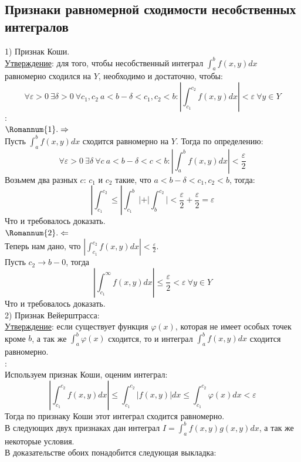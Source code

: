 \documentclass[12pt]{article}
\begin{document}
\subsection{Признаки равномерной сходимости несобственных интегралов}
1) Признак Коши.\\
\uline{Утверждение}: для того, чтобы несобственный интеграл $\int_a^b f(x,y) dx$ равномерно сходился на $Y$, необходимо и достаточно, чтобы:\\
$$\forall \varepsilon > 0 \ \exists \delta > 0 \ \forall c_1, c_2 \ a < b-\delta < c_1,c_2<b : |\int_{c_1}^{c_2} f(x,y) dx | < \varepsilon \ \forall y \in Y$$
:\\
$\Romannum{1}. \Rightarrow$\\
Пусть $\int_a^b f(x,y)dx$ сходится равномерно на $Y$. Тогда по определению:\\
$$\forall \varepsilon > 0 \ \exists \delta \ \forall c \ a < b -\delta < c < b : |\int_a^b f(x,y) dx| < \frac{\varepsilon}{2}$$
Возьмем два разных $c$: $c_1$ и $c_2$ такие, что $a < b-\delta < c_1,c_2 < b$, тогда:\\
$$|\int_{c_1}^{c_2} \leq |\int_{c_1}^b| + |\int_b^{c_2}| < \frac{\varepsilon}{2} + \frac{\varepsilon}{2} = \varepsilon$$
Что и требовалось доказать.\\
$\Romannum{2}. \Leftarrow$\\
Теперь нам дано, что $|\int_{c_1}^{c_2} f(x,y) dx| < \frac{\varepsilon}{2}$.\\
Пусть $c_2 \to b-0$, тогда\\
$$|\int_{c_1}^\infty f(x,y) dx | \leq \frac{\varepsilon}{2} < \varepsilon \ \forall y \in Y$$
Что и требовалось доказать.\\
2) Признак Вейерштрасса:\\
\uline{Утверждение}: если существует функция $\varphi(x)$, которая не имеет особых точек кроме $b$, а так же $\int_a^b \varphi(x)$ сходится, то и интеграл $\int_a^b f(x,y) dx$ сходится равномерно.\\
:\\
Используем признак Коши, оценим интеграл:\\
$$|\int_{c_1}^{c_2} f(x,y) dx| \leq \int_{c_1}^{c_2} |f(x,y)| dx \leq \int_{c_1}^{c_2} \varphi(x) dx < \varepsilon$$
Тогда по признаку Коши этот интеграл сходится равномерно.\\
В следующих двух признаках дан интеграл $I = \int_a^b f(x,y) g(x,y) dx$, а так же некоторые условия.\\
В доказательстве обоих понадобится следующая выкладка:\\
\end{document}
